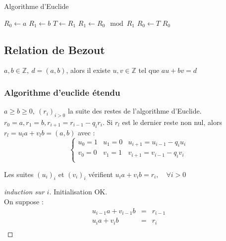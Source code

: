 \documentclass[a4paper, 10pt]{thesis}
\begin{document}
\begin{algorithm}[h]
    \caption{Algorithme d'Euclide}
    \begin{algorithmic}[1]
            \State $R_0 \gets a$
            \State $R_1 \gets b$
                \State $T \gets R_1$
                \State $R_1 \gets R_0 \mod R_1$
                \State $R_0 \gets T$
            \EndWhile
            \State \Return $R_0$
        \EndFunction
    \end{algorithmic}
\end{algorithm}

\subsection{Relation de Bezout}

$a, b \in \mathbb{Z},\ d = (a,b)$, alors il existe $u, v \in \mathbb{Z}$ tel que $au + bv = d$

\subsubsection{Algorithme d'euclide étendu}

$a \geq b \geq 0,\ (r_i)_{i>0}$ la suite des restes de l'algorithme d'Euclide. $r_0 = a, r_1 = b,
r_{i+1} = r_{i-1} - q_i r_i$. Si $r_l$ est le dernier reste non nul, alors $r_l = u_la + v_l b = (a,
b)$ avec : \begin{displaymath}
    \left \lbrace \begin{array}{rcl}
        u_0 = 1 & u_1 = 0 & u_{i+1} = u_{i-1} - q_i u_i \\
        v_0 = 0 & v_1 = 1 & v_{i+1} = v_{i-1} - q_i v_i \\
    \end{array}
    \right .
\end{displaymath}

\begin{prop}
    Les suites $(u_i)_i$ et $(v_i)_i$ vérifient $u_i a + v_i b = r_i,\quad \forall i > 0$
\end{prop}

\begin{proof}[induction sur $i$]
    Initialisation OK.\\
    On suppose : \begin{displaymath}
        \begin{array}{rcl}
            u_{i-1}a + v_{i-1}b & = & r_{i-1} \\
            u_i a + v_i b & = & r_i \\
        \end{array}
    \end{displaymath}
\end{proof}
\end{document}

